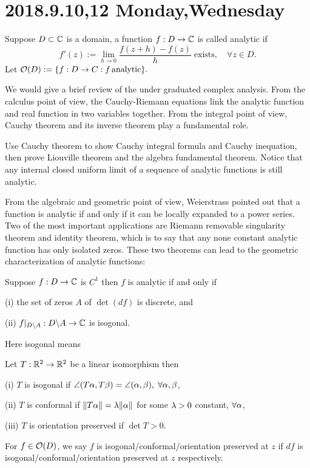 \section{2018.9.10,12 Monday,Wednesday}
\begin{defi}
	Suppose $D\subset \mathbb{C}$ is a domain, a function $f:D\to\mathbb{C}$ is called analytic if
	\[f'(z):=\lim_{h\to 0} \frac{f(z+h)-f(z)}{h}\;\mbox{exists},\quad \forall z\in D.\]
	Let $\mathcal{O}(D):=\{f:D\to C: f\,\mbox{analytic}\}.$
\end{defi}
We would give a brief review of the under graduated complex analysis. From the calculus point of view, 
the Cauchy-Riemann equations link the analytic function and real function in two variables together.
From the integral point of view, Cauchy theorem and its inverse theorem play a fundamental role. 
\begin{ex}
	Use Cauchy theorem to show Cauchy integral formula and Cauchy inequation, then prove Liouville theorem
	and the algebra fundamental theorem. Notice that any internal closed uniform limit of a sequence of analytic
	functions is still analytic.
\end{ex}

From the algebraic and geometric point of view, Weierstrass pointed out that a function is analytic if and only if it can be locally expanded
to a power series. Two of the most important applications are Riemann removable singularity theorem and identity theorem, 
which is to say that any none constant analytic function has only isolated zeros. These two theorems can lead to the 
geometric characterization of analytic functions:
\begin{thm}
	Suppose $f:D\to \mathbb{C}$ is $C^1$ then $f$ is analytic if and only if
	\begin{description}
		\item{(i)} the set of zeros $A$ of $\det(df)$ is discrete, and
		\item{(ii)} $f|_{D\backslash A}: D\backslash A\to \mathbb{C}$ is isogonal.
	\end{description}
\end{thm}
Here isogonal means
\begin{defi}
	Let $T:\mathbb{R}^2\to \mathbb{R}^2$ be a linear isomorphism then
	\begin{description}
		\item{(i)} $T$ is isogonal if $\angle (T\alpha,T\beta)=\angle (\alpha,\beta),\;\forall \alpha,\beta$,
		\item{(ii)} $T$ is conformal if $\|T\alpha\|=\lambda \|\alpha\|$ for some $\lambda>0$ constant, $\forall \alpha$,
		\item{(iii)} $T$ is orientation preserved if $\det T>0$.
	\end{description}
	For $f\in\mathcal{O}(D)$, we say $f$ is isogonal/conformal/orientation preserved at $z$ if $df$ is
	isogonal/conformal/orientation preserved at $z$ respectively.
\end{defi}


